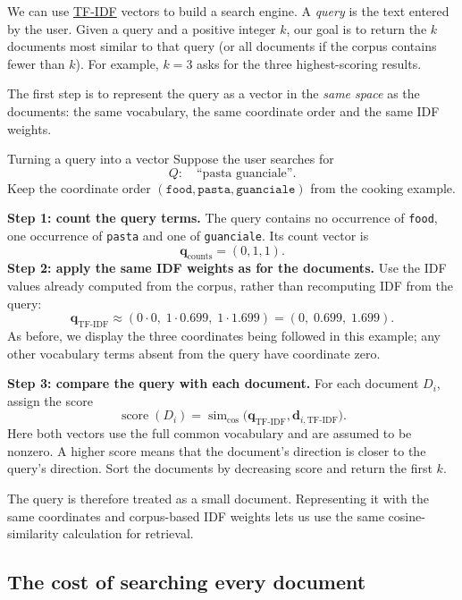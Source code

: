 \documentclass[a4paper,12pt,oneside]{report}
\begin{document}
We can use \hyperref[def:tf-idf]{TF-IDF} vectors to build a search engine. A \emph{query} is
the text entered by the user. Given a query and a positive integer
$k$, our goal is to return the $k$ documents most similar to that
query (or all documents if the corpus contains fewer than $k$).
For example, $k=3$ asks for the three highest-scoring results.

The first step is to represent the query as a vector in the
\emph{same space} as the documents: the same vocabulary, the same
coordinate order and the same IDF weights.

\begin{framedexample}{Turning a query into a vector}
Suppose the user searches for
\[
  Q:\quad\text{``pasta guanciale''}.
\]
Keep the coordinate order
$(\texttt{food},\texttt{pasta},\texttt{guanciale})$ from the cooking
example.

\textbf{Step 1: count the query terms.}
The query contains no occurrence of \texttt{food}, one occurrence of
\texttt{pasta} and one of \texttt{guanciale}. Its count vector is
\[
  \mathbf q_{\text{counts}}=(0,1,1).
\]
\textbf{Step 2: apply the same IDF weights as for the documents.}
Use the IDF values already computed from the corpus, rather than
recomputing IDF from the query:
\[
  \mathbf q_{\text{TF-IDF}}
  \approx(0\cdot0,\;1\cdot0.699,\;1\cdot1.699)
  =(0,\;0.699,\;1.699).
\]
As before, we display the three coordinates being followed in this
example; any other vocabulary terms absent from the query have
coordinate zero.

\textbf{Step 3: compare the query with each document.}
For each document $D_i$, assign the score
\[
  \operatorname{score}(D_i)
  =\operatorname{sim}_{\cos}
    \bigl(\mathbf q_{\text{TF-IDF}},\mathbf d_{i,\text{TF-IDF}}\bigr).
\]
Here both vectors use the full common vocabulary and are assumed to
be nonzero. A higher score means that the document's direction is
closer to the query's direction. Sort the documents by decreasing
score and return the first $k$.
\end{framedexample}

The query is therefore treated as a small document. Representing it
with the same coordinates and corpus-based IDF weights lets us use
the same cosine-similarity calculation for retrieval.

\subsection{The cost of searching every document}\label{sec:search-all-cost}
\end{document}
